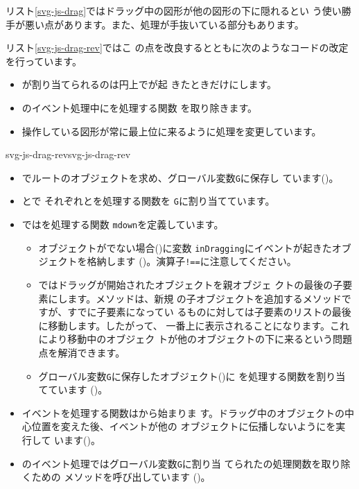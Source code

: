 リスト\ref{svg-js-drag}ではドラッグ中の図形が他の図形の下に隠れるとい
う使い勝手が悪い点があります。また、処理が手抜いている部分もあります。

リスト\ref{svg-js-drag-rev}ではこ
の点を改良するとともに次のようなコードの改定を行っています。

\begin{itemize}
 \item {}が割り当てられるのは円上でが起
       きたときだけにします。
 \item {}のイベント処理中にを処理する関数
       を取り除きます。
 \item 操作している図形が常に最上位に来るように処理を変更しています。
\end{itemize}
    {svg-js-drag-rev}{svg-js-drag-rev}
\begin{itemize}
 \item {}でルートのオブジェクトを求め、グローバル変数\texttt{G}に保存し
       ています()。
 \item {}とで
       それぞれとを処理する関数を
       \texttt{G}に割り当てています。
 \item {}ではを処理する関数
       \texttt{mdown}を定義しています。
\begin{itemize}
 \item オブジェクトがでない場合()に変数
       \texttt{inDragging}にイベントが起きたオブジェクトを格納します
	  ()。演算子\verb+!==+に注意してください。
    \item {}ではドラッグが開始されたオブジェクトを親オブジェ
	  クトの最後の子要素にします。メソッドは、新規
	  の子オブジェクトを追加するメソッドですが、すでに子要素になってい
	  るものに対しては子要素のリストの最後に移動します。したがって、
	  一番上に表示されることになります。これにより移動中のオブジェク
	  トが他のオブジェクトの下に来るという問題点を解消できます。
    \item グローバル変数\texttt{G}に保存したオブジェクト()に
	  を処理する関数を割り当てています
	  ()。
\end{itemize}
 \item {}イベントを処理する関数はから始まりま
       す。ドラッグ中のオブジェクトの中心位置を変えた後、イベントが他の
       オブジェクトに伝播しないようにを実行して
       います()。
 \item {}のイベント処理ではグローバル変数\texttt{G}に割り当
       てられたの処理関数を取り除くための
     メソッドを呼び出しています
       ()。
\end{itemize}

